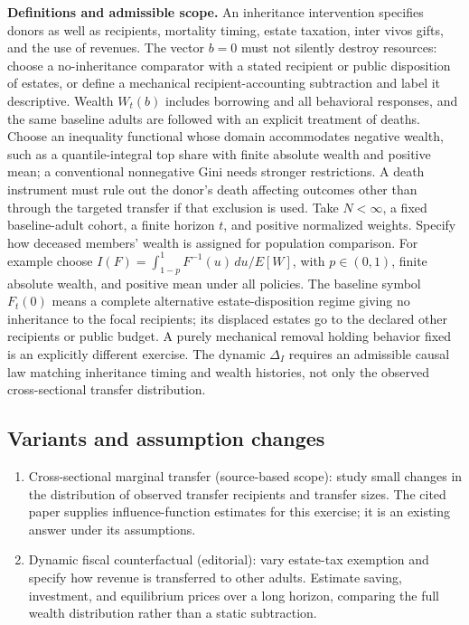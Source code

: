 \documentclass[11pt,a4paper]{article}
\begin{document}
\textbf{Definitions and admissible scope.} An inheritance intervention specifies donors as well as recipients, mortality timing, estate taxation, inter vivos gifts, and the use of revenues. The vector \(b=0\) must not silently destroy resources: choose a no-inheritance comparator with a stated recipient or public disposition of estates, or define a mechanical recipient-accounting subtraction and label it descriptive. Wealth \(W_t(b)\) includes borrowing and all behavioral responses, and the same baseline adults are followed with an explicit treatment of deaths. Choose an inequality functional whose domain accommodates negative wealth, such as a quantile-integral top share with finite absolute wealth and positive mean; a conventional nonnegative Gini needs stronger restrictions. A death instrument must rule out the donor's death affecting outcomes other than through the targeted transfer if that exclusion is used. Take \(N<\infty\), a fixed baseline-adult cohort, a finite horizon \(t\), and positive normalized weights. Specify how deceased members' wealth is assigned for population comparison. For example choose \(I(F)=\int_{1-p}^1F^{-1}(u)\,du/E[W]\), with \(p\in(0,1)\), finite absolute wealth, and positive mean under all policies. The baseline symbol \(F_t(0)\) means a complete alternative estate-disposition regime giving no inheritance to the focal recipients; its displaced estates go to the declared other recipients or public budget. A purely mechanical removal holding behavior fixed is an explicitly different exercise. The dynamic \(\Delta_I\) requires an admissible causal law matching inheritance timing and wealth histories, not only the observed cross-sectional transfer distribution.
\subsection*{Variants and assumption changes}
\begin{enumerate}
\item Cross-sectional marginal transfer (source-based scope): study small changes in the distribution of observed transfer recipients and transfer sizes. The cited paper supplies influence-function estimates for this exercise; it is an existing answer under its assumptions.
\item Dynamic fiscal counterfactual (editorial): vary estate-tax exemption and specify how revenue is transferred to other adults. Estimate saving, investment, and equilibrium prices over a long horizon, comparing the full wealth distribution rather than a static subtraction.
\end{enumerate}
\end{document}
